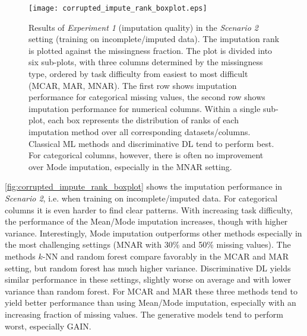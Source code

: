 \begin{figure}\centering
    \texttt{[image: corrupted\_impute\_rank\_boxplot.eps]}

    \caption[Imputation Ranks - Corrupted]{Results of \textit{Experiment 1} (imputation quality) in the \textit{Scenario 2} setting (training on incomplete/imputed data). The imputation rank is plotted against the missingness fraction. The plot is divided into six sub-plots, with three columns determined by the missingness type, ordered by task difficulty from easiest to most difficult (MCAR, MAR, MNAR). The first row shows imputation performance for categorical missing values,  the second row shows imputation performance for numerical columns. Within a single sub-plot, each box represents the distribution of ranks of each imputation method over all corresponding datasets/columns. Classical ML methods and discriminative DL tend to perform best. For categorical columns, however, there is often no improvement over Mode imputation, especially in the MNAR setting.
    }
	\label{fig:corrupted_impute_rank_boxplot}
\end{figure}

\autoref{fig:corrupted_impute_rank_boxplot} shows the imputation performance in \textit{Scenario 2}, i.e. when training on incomplete/imputed data. For categorical columns it is even harder to find clear patterns. With increasing task difficulty, the performance of the Mean/Mode imputation increases, though with higher variance. Interestingly, Mode imputation outperforms other methods especially in the most challenging settings (MNAR with 30\% and 50\% missing values). The methods $k$-NN and random forest compare favorably in the MCAR and MAR setting, but random forest has much higher variance. Discriminative DL yields similar performance in these settings, slightly worse on average and with lower variance than random forest. For MCAR and MAR these three methods tend to yield better performance than using Mean/Mode imputation, especially with an increasing fraction of missing values. The generative models tend to perform worst, especially GAIN.

